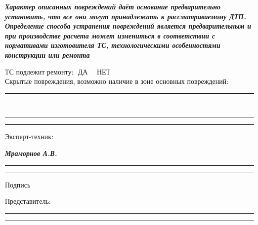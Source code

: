 \documentclass[a4paper,10pt]{report}
\begin{document}
\vspace{-12mm}

\vspace{-3mm}
\begin{tcolorbox}[title=\textsl{Примечание},leftrule=-0.4pt,rightrule=-0.4pt,toprule=0pt,titlerule=0pt,sharp corners,
	colback=white,colframe=black,coltitle=black,colbacktitle=YellowOrange]
{\footnotesize \textbf{\textit{{Характер описанных повреждений даёт основание предварительно установить, что все они могут принадлежать
				к рассматриваемому ДТП. Определение способа устранения повреждений является предварительным и при
				производстве расчета может измениться в соответствии с нормативами изготовителя ТС, технологическими
				особенностями конструкции или ремонта}}}}
\end{tcolorbox}

\vspace{2mm}

\noindent ТС подлежит ремонту:\,\, ДА\, \,\,\, НЕТ \\
\noindent Скрытые повреждения, возможно наличие в зоне основных повреждений: \rule{50mm}{0.1mm}\\
\rule{170mm}{0.1mm}
\rule{170mm}{0.1mm}

\vspace{3mm}
\begin{tcolorbox}[title=\textsl{Подписи и замечания сторон},leftrule=0pt,rightrule=0pt,toprule=0pt,titlerule=0pt,sharp corners,
	colback=white,colframe=white,coltitle=black,colbacktitle=YellowOrange]
\end{tcolorbox}
\vspace{-5mm}
\centering
\raggedright Эксперт-техник: \\ \hspace{1.7cm}
\raggedright\textbf{\textsl{ Мраморнов А.В. }}
\vspace{-3mm}

\centering 
\rule{50mm}{0.1mm} \hspace{5cm} \rule{50mm}{0.1mm}

\hspace{10.5cm} {\footnotesize Подпись}

\vspace{0mm}
\centering
\raggedright Представитель: \\ \hspace{1.7cm}
\raggedright\textbf{  }
\vspace{-3mm}

\centering 
\rule{50mm}{0.1mm} \hspace{5cm} \rule{50mm}{0.1mm}
\end{document}
